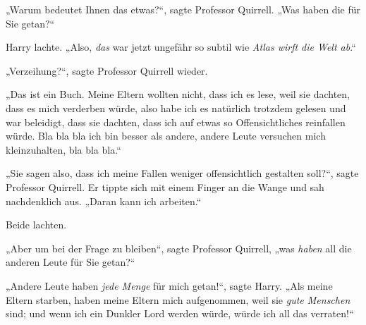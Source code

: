„Warum bedeutet Ihnen das etwas?“, sagte Professor Quirrell. „Was haben die für Sie getan?“

Harry lachte. „Also, \emph{das} war jetzt ungefähr so subtil wie \emph{Atlas wirft die Welt ab}.“

„Verzeihung?“, sagte Professor Quirrell wieder.

„Das ist ein Buch. Meine Eltern wollten nicht, dass ich es lese, weil sie dachten, dass es mich verderben würde, also habe ich es natürlich trotzdem gelesen und war beleidigt, dass sie dachten, dass ich auf etwas so Offensichtliches reinfallen würde. Bla bla bla ich bin besser als andere, andere Leute versuchen mich kleinzuhalten, bla bla bla.“

„Sie sagen also, dass ich meine Fallen weniger offensichtlich gestalten soll?“, sagte Professor Quirrell. Er tippte sich mit einem Finger an die Wange und sah nachdenklich aus. „Daran kann ich arbeiten.“

Beide lachten.

„Aber um bei der Frage zu bleiben“, sagte Professor Quirrell, „was \emph{haben} all die anderen Leute für Sie getan?“

„Andere Leute haben \emph{jede Menge} für mich getan!“, sagte Harry. „Als meine Eltern starben, haben meine Eltern mich aufgenommen, weil sie \emph{gute Menschen} sind; und wenn ich ein Dunkler Lord werden würde, würde ich all das verraten!“

